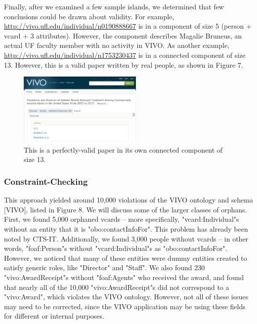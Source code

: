 \documentclass[11pt]{article}
\begin{document}
\pagebreak

Finally, after we examined a few sample islands, we determined that few conclusions could be drawn about validity. For example, \url{http://vivo.ufl.edu/individual/n0190888667} is in a component of size 5 (person + vcard + 3 attributes). However, the component describes Magalie Bruneus, an actual UF faculty member with no activity in VIVO. As another example, \url{http://vivo.ufl.edu/individual/n1753230437} is in a connected component of size 13. However, this is a valid paper written by real people, as shown in Figure 7.

\begin{figure}[h!]
\centering
\includegraphics[width=6cm]{valid-paper.png}
\caption{This is a perfectly-valid paper in its own connected component of size 13.}
\label{fig:output}
\end{figure}

\qquad

\pagebreak

\subsubsection*{Constraint-Checking}
This approach yielded around 10,000 violations of the VIVO ontology and schema [VIVO], listed in Figure 8. We will discuss some of the larger classes of orphans. First, we found 5,000 orphaned vcards -- more specifically, "vcard:Individual"s without an entity that it is "obo:contactInfoFor". This problem has already been noted by CTS-IT. Additionally, we found 3,000 people without vcards -- in other words, "foaf:Person"s without "vcard:Individual"s as "obo:contactInfoFor". However, we noticed that many of these entities were dummy entities created to satisfy generic roles, like "Director" and "Staff". We also found 230 "vivo:AwardReceipt"s without "foaf:Agents" who received the award, and found that nearly all of the 10,000 "vivo:AwardReceipt"s did not correspond to a "vivo:Award", which violates the VIVO ontology. However, not all of these issues may need to be corrected, since the VIVO application may be using these fields for different or internal purposes.
\end{document}

